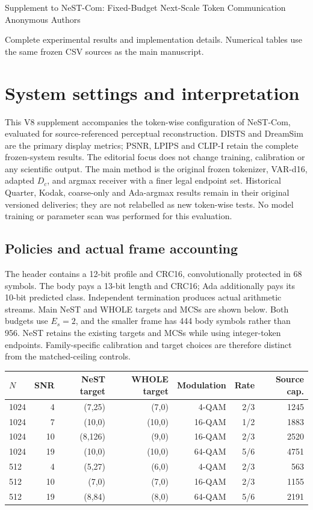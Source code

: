 \documentclass[10pt,letterpaper]{article}
\begin{document}
\begin{center}\Large Supplement to NeST-Com: Fixed-Budget Next-Scale Token Communication\\[4pt]\normalsize Anonymous Authors\end{center}
Complete experimental results and implementation details. Numerical tables use the same frozen CSV sources as the main manuscript.
\section{System settings and interpretation}
This V8 supplement accompanies the token-wise configuration of NeST-Com, evaluated for source-referenced perceptual reconstruction. DISTS and DreamSim are the primary display metrics; PSNR, LPIPS and CLIP-I retain the complete frozen-system results. The editorial focus does not change training, calibration or any scientific output. The main method is the original frozen tokenizer, VAR-d16, adapted $D_c$, and argmax receiver with a finer legal endpoint set. Historical Quarter, Kodak, coarse-only and Ada-argmax results remain in their original versioned deliveries; they are not relabelled as new token-wise tests. No model training or parameter scan was performed for this evaluation.

\subsection{Policies and actual frame accounting}
The header contains a 12-bit profile and CRC16, convolutionally protected in 68 symbols. The body pays a 13-bit length and CRC16; Ada additionally pays its 10-bit predicted class. Independent termination produces actual arithmetic streams. Main NeST and WHOLE targets and MCSs are shown below. Both budgets use $E_s=2$, and the smaller frame has 444 body symbols rather than 956. NeST retains the existing targets and MCSs while using integer-token endpoints. Family-specific calibration and target choices are therefore distinct from the matched-ceiling controls.

\begin{longtable}{@{}lrrrrrr@{}}\toprule
$N$ & SNR & NeST target & WHOLE target & Modulation & Rate & Source cap.\\\midrule\endhead
1024 & 4 & (7,25) & (7,0) & 4-QAM & 2/3 & 1245\\
1024 & 7 & (10,0) & (10,0) & 16-QAM & 1/2 & 1883\\
1024 & 10 & (8,126) & (9,0) & 16-QAM & 2/3 & 2520\\
1024 & 19 & (10,0) & (10,0) & 64-QAM & 5/6 & 4751\\
512 & 4 & (5,27) & (6,0) & 4-QAM & 2/3 & 563\\
512 & 10 & (7,0) & (7,0) & 16-QAM & 2/3 & 1155\\
512 & 19 & (8,84) & (8,0) & 64-QAM & 5/6 & 2191\\
\bottomrule\end{longtable}
\end{document}
